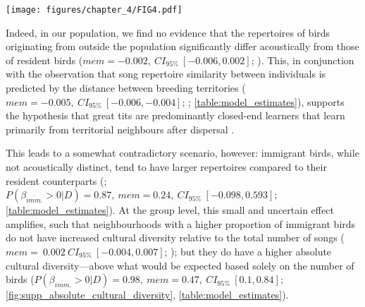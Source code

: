 \begin{figure*}[th!]
    \centering
    \texttt{[image: figures/chapter\_4/FIG4.pdf]}
    \label{c4_fig:turnover}
\end{figure*}

Indeed, in our population, we find no evidence that the repertoires of birds originating from outside the population significantly differ acoustically from those of resident birds ($mem = -0.002,~CI_{95\%}~[-0.006, 0.002]$; ). This, in conjunction with the observation that song repertoire similarity between individuals is predicted by the distance between breeding territories ($mem = -0.005,~CI_{95\%}~[-0.006, -0.004]$; ; \autoref{table:model_estimates}), supports the hypothesis that great tits are predominantly closed-end learners that learn primarily from territorial neighbours after dispersal \autocite{mcgregor1982b, rivera-gutierrez2011}.

This leads to a somewhat contradictory scenario, however: immigrant birds, while not acoustically distinct, tend to have larger repertoires compared to their resident counterparts (; $P(\beta_{\overline{imm}.} > 0 | D) = 0.87,~mem=0.24,~CI_{95\%}~[-0.098, 0.593]$; \autoref{table:model_estimates}). At the group level, this small and uncertain effect amplifies, such that neighbourhoods with a higher proportion of immigrant birds do not have increased cultural diversity relative to the total number of songs ($mem=~0.002~CI_{95\%}~[-0.004, 0.007]$; ); but they do have a higher absolute cultural diversity---above what would be expected based solely on the number of birds ($P(\beta_{\overline{imm}.} > 0 | D) = 0.98,~mem=0.47,~CI_{95\%}~[0.1, 0.84]$; \autoref{fig:supp_absolute_cultural_diversity}, \autoref{table:model_estimates}). 

